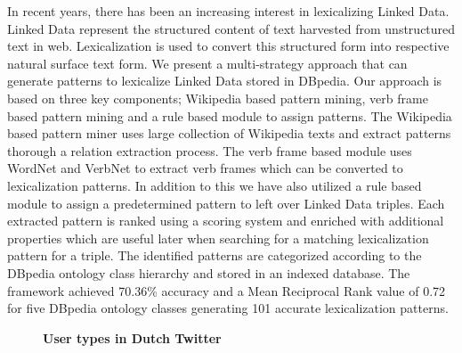 \documentclass[10pt, a4paper, twopage, headinclude, footinclude, BCOR5mm]{scrartcl}
\begin{document}
\noindent
In recent years, there has been an increasing interest in lexicalizing Linked Data. Linked Data represent the structured content of text harvested from unstructured text in web. Lexicalization is used to convert this structured form into respective natural surface text form. We present a multi-strategy approach that can generate patterns to lexicalize Linked Data stored in DBpedia. Our approach is based on three key components; Wikipedia based pattern mining, verb frame based pattern mining and a rule based module to assign patterns. The Wikipedia based pattern miner uses large collection of Wikipedia texts and extract patterns thorough a relation extraction process. The verb frame based module uses WordNet and VerbNet to extract verb frames which can be converted to lexicalization patterns. In addition to this we have also utilized a rule based module to assign a predetermined pattern to left over Linked Data triples.  Each extracted pattern is ranked using a scoring system and enriched with additional properties which are useful later when searching for a matching lexicalization pattern for a triple. The identified patterns are categorized according to the DBpedia ontology class hierarchy and stored in an indexed database. The framework achieved 70.36\% accuracy and a Mean Reciprocal Rank value of 0.72 for five DBpedia ontology classes generating 101 accurate lexicalization patterns.


\newpage

\begin{figure}[t!]
\centering
\large\textbf{User types in Dutch Twitter}
\vspace*{0.5cm}
\end{figure}


        \begin{table}[t!]
    \end{table}
\end{document}
